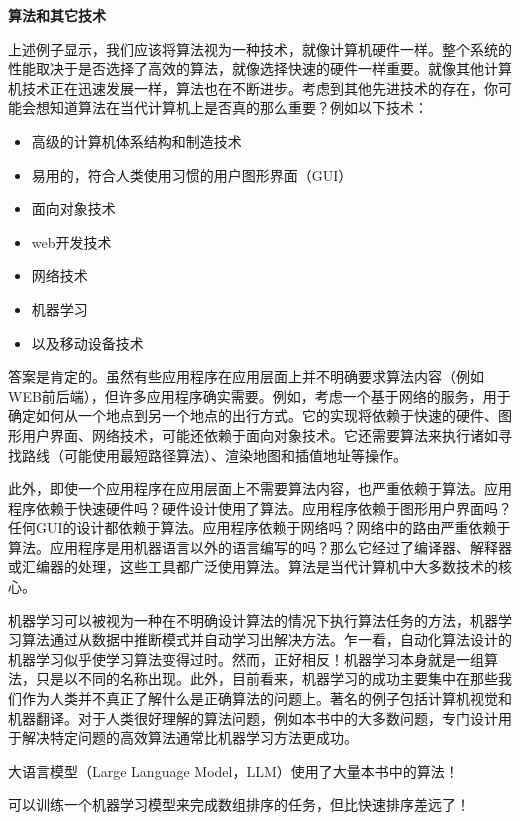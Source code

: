 \documentclass[lang=cn,newtx,10pt,scheme=chinese]{elegantbook}
\begin{document}
\textbf{算法和其它技术}

上述例子显示，我们应该将算法视为一种技术，就像计算机硬件一样。整个系统的性能取决于是否选择了高效的算法，就像选择快速的硬件一样重要。就像其他计算机技术正在迅速发展一样，算法也在不断进步。考虑到其他先进技术的存在，你可能会想知道算法在当代计算机上是否真的那么重要？例如以下技术：

\begin{itemize}
    \item 高级的计算机体系结构和制造技术
    \item 易用的，符合人类使用习惯的用户图形界面（GUI）
    \item 面向对象技术
    \item web开发技术
    \item 网络技术
    \item 机器学习
    \item 以及移动设备技术
\end{itemize}

答案是肯定的。虽然有些应用程序在应用层面上并不明确要求算法内容（例如WEB前后端），但许多应用程序确实需要。例如，考虑一个基于网络的服务，用于确定如何从一个地点到另一个地点的出行方式。它的实现将依赖于快速的硬件、图形用户界面、网络技术，可能还依赖于面向对象技术。它还需要算法来执行诸如寻找路线（可能使用最短路径算法）、渲染地图和插值地址等操作。

此外，即使一个应用程序在应用层面上不需要算法内容，也严重依赖于算法。应用程序依赖于快速硬件吗？硬件设计使用了算法。应用程序依赖于图形用户界面吗？任何GUI的设计都依赖于算法。应用程序依赖于网络吗？网络中的路由严重依赖于算法。应用程序是用机器语言以外的语言编写的吗？那么它经过了编译器、解释器或汇编器的处理，这些工具都广泛使用算法。算法是当代计算机中大多数技术的核心。

机器学习可以被视为一种在不明确设计算法的情况下执行算法任务的方法，机器学习算法通过从数据中推断模式并自动学习出解决方法。乍一看，自动化算法设计的机器学习似乎使学习算法变得过时。然而，正好相反！机器学习本身就是一组算法，只是以不同的名称出现。此外，目前看来，机器学习的成功主要集中在那些我们作为人类并不真正了解什么是正确算法的问题上。著名的例子包括计算机视觉和机器翻译。对于人类很好理解的算法问题，例如本书中的大多数问题，专门设计用于解决特定问题的高效算法通常比机器学习方法更成功。

\begin{marker}
    大语言模型（Large Language Model，LLM）使用了大量本书中的算法！

    可以训练一个机器学习模型来完成数组排序的任务，但比快速排序差远了！
\end{marker}
\end{document}
